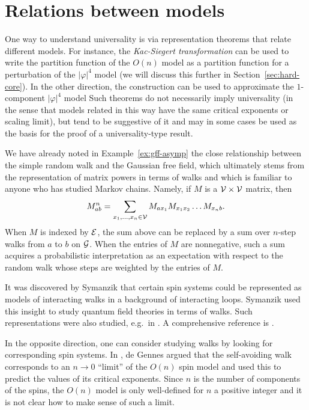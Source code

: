 \section{Relations between models}
\label{sec:spin-walk}

One way to understand universality is via representation theorems that relate
different models. For instance, the \emph{Kac-Siegert transformation}
can be used to write the partition function of the $O(n)$ model as a partition function
for a perturbation of the $|\varphi|^4$ model (we will discuss this further in
Section~\ref{sec:hard-core}). In the other direction, the
 construction \cite{SG73} can be used to approximate the $1$-component
$|\varphi|^4$ model 
Such theorems do not necessarily imply universality
(in the sense that models related in this way have the same critical exponents or
scaling limit), but tend to be suggestive of it and may in some cases
be used as the basis for the proof of a universality-type result.

We have already noted in Example~\ref{ex:gff-asymp} the close relationship between
the simple random walk
and the Gaussian free field, which ultimately stems from the representation of
matrix powers in terms of walks and which is familiar to anyone
who has studied Markov chains. Namely, if $M$ is a $\mathcal{V}\times\mathcal{V}$
matrix, then
\begin{equation}
M^n_{ab} = \sum_{x_1,\ldots,x_n\in\mathcal{V}} M_{ax_1} M_{x_1x_2} \ldots M_{x_nb}.
\end{equation}
When $M$ is indexed by $\mathcal{E}$, the
sum above can be replaced by a sum over $n$-step walks from $a$ to $b$ on $\mathcal{G}$.
When the entries of $M$ are nonnegative, such a sum acquires a probabilistic
interpretation as an expectation with respect to the random walk whose steps
are weighted by the entries of $M$.

It was discovered by Symanzik \cite{Syma69} that certain spin systems could be
represented as models of interacting walks in a background of interacting loops.
Symanzik used this insight to study quantum field theories in terms of walks.
Such representations were also studied, e.g.\ in \cite{BFS82,Dynk83}. A comprehensive
reference is \cite{FFS92}.

In the opposite direction, one can consider studying walks by looking for corresponding
spin systems. In \cite{Genn72}, de Gennes argued that the self-avoiding walk
corresponds to an $n \to 0$ ``limit'' of the $O(n)$ spin model and used this
to predict the values of its critical exponents. Since $n$ is
the number of components of the spins, the $O(n)$ model is only well-defined
for $n$ a positive integer and it is not clear how to make sense of such a limit.

